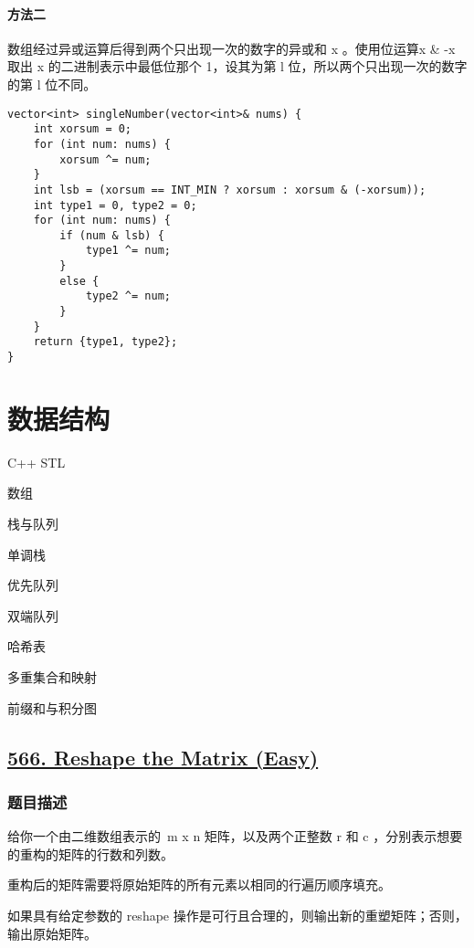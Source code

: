 \documentclass[lang=cn,10pt]{elegantbook}
\begin{document}
\subsubsection*{方法二}

数组经过异或运算后得到两个只出现一次的数字的异或和 x 。使用位运算x \& -x 取出 x 的二进制表示中最低位那个 1，设其为第 l 位，所以两个只出现一次的数字的第 l 位不同。

\begin{lstlisting}
vector<int> singleNumber(vector<int>& nums) {
	int xorsum = 0;
	for (int num: nums) {
		xorsum ^= num;
	}
	int lsb = (xorsum == INT_MIN ? xorsum : xorsum & (-xorsum));
	int type1 = 0, type2 = 0;
	for (int num: nums) {
		if (num & lsb) {
			type1 ^= num;
		}
		else {
			type2 ^= num;
		}
	}
	return {type1, type2};
}
\end{lstlisting}

\chapter{数据结构}

\begin{introduction}[前情提要]
	\item C++ STL
	\item 数组
	\item 栈与队列
	\item 单调栈
	\item 优先队列
	\item 双端队列
	\item 哈希表
	\item 多重集合和映射
	\item 前缀和与积分图
\end{introduction}

{\color{red}\section{\href{https://leetcode.cn/problems/reshape-the-matrix/}{566. Reshape the Matrix (Easy)}}} \label{ch11.566}

\subsection*{题目描述}

给你一个由二维数组表示的 m x n 矩阵，以及两个正整数 r 和 c ，分别表示想要的重构的矩阵的行数和列数。

重构后的矩阵需要将原始矩阵的所有元素以相同的行遍历顺序填充。

如果具有给定参数的 reshape 操作是可行且合理的，则输出新的重塑矩阵；否则，输出原始矩阵。
\end{document}
